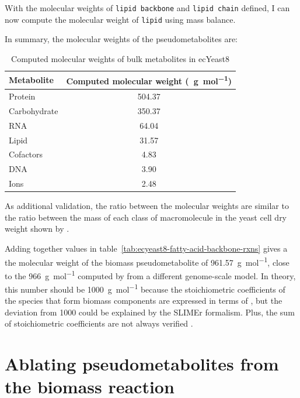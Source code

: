With the molecular weights of \texttt{lipid backbone} and \texttt{lipid chain} defined, I can now compute the molecular weight of \texttt{lipid} using mass balance.

In summary, the molecular weights of the pseudometabolites are:
\begin{table}[ht]
  \centering
  \begin{tabular}{lS}
    Metabolite & {Computed molecular weight (\SI{}{\gram~\mol^{-1}})} \\
    \hline
    Protein & 504.37 \\
    Carbohydrate & 350.37 \\
    RNA & 64.04 \\
    Lipid & 31.57 \\
    Cofactors & 4.83 \\
    DNA & 3.90 \\
    Ions & 2.48
  \end{tabular}
  \caption{Computed molecular weights of bulk metabolites in ecYeast8}
  \label{tab:ecyeast8-mol-weights}
\end{table}

As additional validation, the ratio between the molecular weights are similar to the ratio between the mass of each class of macromolecule in the yeast cell dry weight shown by \textcite{canelasVivoDatadrivenFramework2011}.

Adding together values in table~\ref{tab:ecyeast8-fatty-acid-backbone-rxns} gives a the molecular weight of the biomass pseudometabolite of \SI{961.57}{\gram~\mol^{-1}}, close to the \SI{966}{\gram~\mol^{-1}} computed by \textcite{takhaveevTemporalSegregationBiosynthetic2023} from a different genome-scale model.
In theory, this number should be \SI{1000}{\gram~\mol^{-1}} because the stoichiometric coefficients of the species that form biomass components are expressed in terms of \SI{}{\mmolgdw} \parencite{thieleProtocolGeneratingHighquality2010, palssonSystemsBiologyConstraintbased2015}, but the deviation from 1000 could be explained by the SLIMEr formalism.
Plus, the sum of stoichiometric coefficients are not always verified \parencite{chanStandardizingBiomassReactions2017}.

\section{Ablating pseudometabolites from the biomass reaction}
\label{sec:model-yeast8-pseudometabolites}

